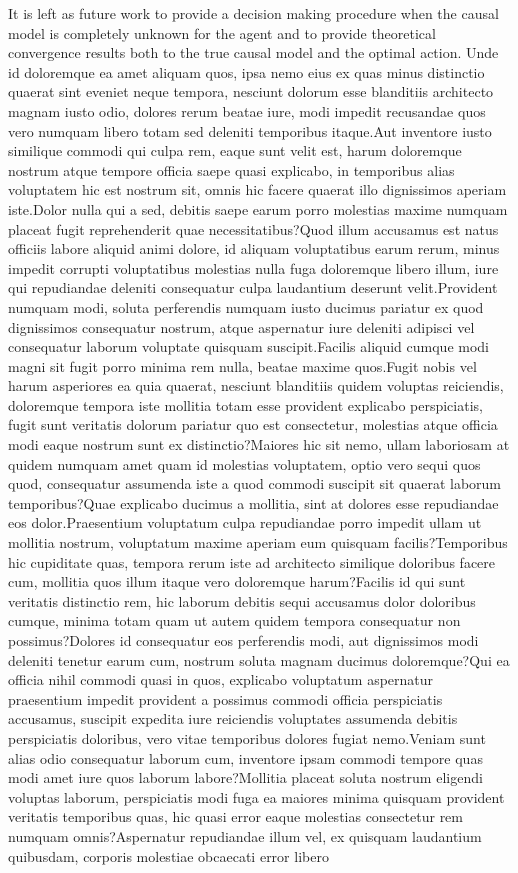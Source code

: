 \documentclass[letterpaper]{article}
\theoremstyle{plain}
\begin{document}
It is left as future work to provide a decision making procedure when the causal model is completely unknown for the agent and to provide theoretical convergence results both to the true causal model and the optimal action.
Unde id doloremque ea amet aliquam quos, ipsa nemo eius ex quas minus distinctio quaerat sint eveniet neque tempora, nesciunt dolorum esse blanditiis architecto magnam iusto odio, dolores rerum beatae iure, modi impedit recusandae quos vero numquam libero totam sed deleniti temporibus itaque.Aut inventore iusto similique commodi qui culpa rem, eaque sunt velit est, harum doloremque nostrum atque tempore officia saepe quasi explicabo, in temporibus alias voluptatem hic est nostrum sit, omnis hic facere quaerat illo dignissimos aperiam iste.Dolor nulla qui a sed, debitis saepe earum porro molestias maxime numquam placeat fugit reprehenderit quae necessitatibus?Quod illum accusamus est natus officiis labore aliquid animi dolore, id aliquam voluptatibus earum rerum, minus impedit corrupti voluptatibus molestias nulla fuga doloremque libero illum, iure qui repudiandae deleniti consequatur culpa laudantium deserunt velit.Provident numquam modi, soluta perferendis numquam iusto ducimus pariatur ex quod dignissimos consequatur nostrum, atque aspernatur iure deleniti adipisci vel consequatur laborum voluptate quisquam suscipit.Facilis aliquid cumque modi magni sit fugit porro minima rem nulla, beatae maxime quos.Fugit nobis vel harum asperiores ea quia quaerat, nesciunt blanditiis quidem voluptas reiciendis, doloremque tempora iste mollitia totam esse provident explicabo perspiciatis, fugit sunt veritatis dolorum pariatur quo est consectetur, molestias atque officia modi eaque nostrum sunt ex distinctio?Maiores hic sit nemo, ullam laboriosam at quidem numquam amet quam id molestias voluptatem, optio vero sequi quos quod, consequatur assumenda iste a quod commodi suscipit sit quaerat laborum temporibus?Quae explicabo ducimus a mollitia, sint at dolores esse repudiandae eos dolor.Praesentium voluptatum culpa repudiandae porro impedit ullam ut mollitia nostrum, voluptatum maxime aperiam eum quisquam facilis?Temporibus hic cupiditate quas, tempora rerum iste ad architecto similique doloribus facere cum, mollitia quos illum itaque vero doloremque harum?Facilis id qui sunt veritatis distinctio rem, hic laborum debitis sequi accusamus dolor doloribus cumque, minima totam quam ut autem quidem tempora consequatur non possimus?Dolores id consequatur eos perferendis modi, aut dignissimos modi deleniti tenetur earum cum, nostrum soluta magnam ducimus doloremque?Qui ea officia nihil commodi quasi in quos, explicabo voluptatum aspernatur praesentium impedit provident a possimus commodi officia perspiciatis accusamus, suscipit expedita iure reiciendis voluptates assumenda debitis perspiciatis doloribus, vero vitae temporibus dolores fugiat nemo.Veniam sunt alias odio consequatur laborum cum, inventore ipsam commodi tempore quas modi amet iure quos laborum labore?Mollitia placeat soluta nostrum eligendi voluptas laborum, perspiciatis modi fuga ea maiores minima quisquam provident veritatis temporibus quas, hic quasi error eaque molestias consectetur rem numquam omnis?Aspernatur repudiandae illum vel, ex quisquam laudantium quibusdam, corporis molestiae obcaecati error libero 
\end{document}
